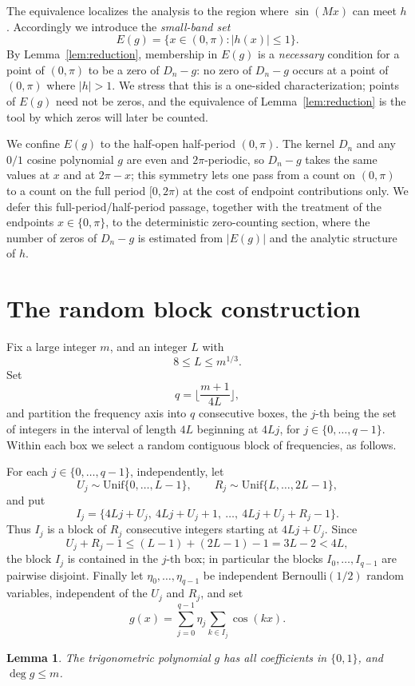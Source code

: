 \documentclass[11pt,reqno]{amsart}
\theoremstyle{plain}
\newtheorem{lemma}{Lemma}
\theoremstyle{definition}
\theoremstyle{remark}
\begin{document}
The equivalence localizes the analysis to the region where $\sin(Mx)$ can meet $h$. Accordingly we introduce the \emph{small-band set}
\[
E(g)=\{x\in(0,\pi):|h(x)|\le 1\}.
\]
By Lemma~\ref{lem:reduction}, membership in $E(g)$ is a \emph{necessary} condition for a point of $(0,\pi)$ to be a zero of $D_n-g$: no zero of $D_n-g$ occurs at a point of $(0,\pi)$ where $|h|>1$. We stress that this is a one-sided characterization; points of $E(g)$ need not be zeros, and the equivalence of Lemma~\ref{lem:reduction} is the tool by which zeros will later be counted.

We confine $E(g)$ to the half-open half-period $(0,\pi)$. The kernel $D_n$ and any $0/1$ cosine polynomial $g$ are even and $2\pi$-periodic, so $D_n-g$ takes the same values at $x$ and at $2\pi-x$; this symmetry lets one pass from a count on $(0,\pi)$ to a count on the full period $[0,2\pi)$ at the cost of endpoint contributions only. We defer this full-period/half-period passage, together with the treatment of the endpoints $x\in\{0,\pi\}$, to the deterministic zero-counting section, where the number of zeros of $D_n-g$ is estimated from $|E(g)|$ and the analytic structure of $h$.

\section{The random block construction}

Fix a large integer $m$, and an integer $L$ with
\[
8 \le L \le m^{1/3}.
\]
Set
\[
q=\Big\lfloor \frac{m+1}{4L}\Big\rfloor,
\]
and partition the frequency axis into $q$ consecutive boxes, the $j$-th being the set of integers in the interval of length $4L$ beginning at $4Lj$, for $j\in\{0,\dots,q-1\}$. Within each box we select a random contiguous block of frequencies, as follows.

For each $j\in\{0,\dots,q-1\}$, independently, let
\[
U_j\sim\mathrm{Unif}\{0,\dots,L-1\},\qquad R_j\sim\mathrm{Unif}\{L,\dots,2L-1\},
\]
and put
\[
I_j=\{4Lj+U_j,\ 4Lj+U_j+1,\ \dots,\ 4Lj+U_j+R_j-1\}.
\]
Thus $I_j$ is a block of $R_j$ consecutive integers starting at $4Lj+U_j$. Since
\[
U_j+R_j-1\le (L-1)+(2L-1)-1=3L-2<4L,
\]
the block $I_j$ is contained in the $j$-th box; in particular the blocks $I_0,\dots,I_{q-1}$ are pairwise disjoint. Finally let $\eta_0,\dots,\eta_{q-1}$ be independent $\mathrm{Bernoulli}(1/2)$ random variables, independent of the $U_j$ and $R_j$, and set
\[
g(x)=\sum_{j=0}^{q-1}\eta_j\sum_{k\in I_j}\cos(kx).
\]

\begin{lemma}\label{lem:coeffs-degree}
The trigonometric polynomial $g$ has all coefficients in $\{0,1\}$, and $\deg g\le m$.
\end{lemma}
\end{document}
